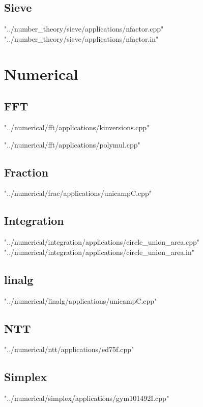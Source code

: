 \documentclass [12pt,onecolumn,oneside]{article}
\begin{document}
\subsection{ Sieve}
 {"../number_theory/sieve/applications/nfactor.cpp"}
 {"../number_theory/sieve/applications/nfactor.in"}
\newpage


\section{Numerical}
\subsection{ FFT}
 {"../numerical/fft/applications/kinversions.cpp"}
\newpage

 {"../numerical/fft/applications/polymul.cpp"}
\newpage

\subsection{ Fraction}
 {"../numerical/frac/applications/unicampC.cpp"}
\newpage

\subsection{ Integration}
 {"../numerical/integration/applications/circle_union_area.cpp"}
 {"../numerical/integration/applications/circle_union_area.in"}
\newpage

\subsection{ linalg}
 {"../numerical/linalg/applications/unicampC.cpp"}
\newpage

\subsection{ NTT}
 {"../numerical/ntt/applications/ed75f.cpp"}
\newpage

\subsection{ Simplex}
 {"../numerical/simplex/applications/gym101492I.cpp"}
\newpage
\end{document}

